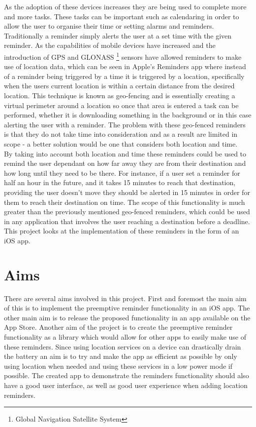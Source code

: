\documentclass[12pt]{report}
\begin{document}
As the adoption of these devices increases they are being used to complete more and more tasks. These tasks can be important such as calendaring in order to allow the user to organise their time or setting alarms and reminders. Traditionally a reminder simply alerts the user at a set time with the given reminder. As the capabilities of mobile devices have increased and the introduction of GPS and GLONASS \footnote{Global Navigation Satellite System} sensors have allowed reminders to make use of location data, which can be seen in Apple's Reminders app where instead of a reminder being triggered by a time it is triggered by a location, specifically when the users current location is within a certain distance from the desired location. This technique is known as geo-fencing \cite{geofence} and is essentially creating a virtual perimeter around a location so once that area is entered a task can be performed, whether it is downloading something in the background or in this case alerting the user with a reminder. The problem with these geo-fenced reminders is that they do not take time into consideration and as a result are limited in scope - a better solution would be one that considers both location and time.\\

By taking into account both location and time these reminders could be used to remind the user dependant on how far away they are from their destination and how long until they need to be there. For instance, if a user set a reminder for half an hour in the future, and it takes 15 minutes to reach that destination, providing the user doesn't move they should be alerted in 15 minutes in order for them to reach their destination on time. The scope of this functionality is much greater than the previously mentioned geo-fenced reminders, which could be used in any application that involves the user reaching a destination before a deadline. This project looks at the implementation of these reminders in the form of an iOS app.\\

\section{Aims}

There are several aims involved in this project. First and foremost the main aim of this is to implement the preemptive reminder functionality in an iOS app. The other main aim is to release the proposed functionality in an app available on the App Store. Another aim of the project is to create the preemptive reminder functionality as a library which would allow for other apps to easily make use of these reminders. Since using location services on a device can drastically drain the battery an aim is to try and make the app as efficient as possible by only using location when needed and using these services in a low power mode if possible. The created app to demonstrate the reminders functionality should also have a good user interface, as well as good user experience when adding location reminders.
\end{document}
